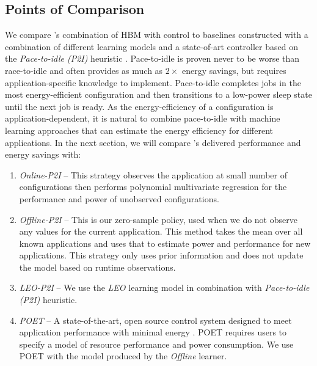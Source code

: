 \subsection{Points of Comparison}
We compare \SYSTEM{}'s combination of HBM with control to baselines
constructed with a combination of different learning models and a
state-of-art controller based on the \emph{Pace-to-idle (P2I)}
heuristic \cite{kim-cpsna}.  Pace-to-idle is proven never to be worse
than race-to-idle and often provides as much as $2\times$ energy
savings, but requires application-specific knowledge to implement.
Pace-to-idle completes jobs in the most energy-efficient configuration
and then transitions to a low-power sleep state until the next job is
ready.  As the energy-efficiency of a configuration is
application-dependent, it is natural to combine pace-to-idle with
machine learning approaches that can estimate the energy efficiency
for different applications.  In the next section, we will compare
\SYSTEM{}'s delivered performance and energy savings with:
\begin{enumerate}
\item \textit{Online-P2I} -- This strategy observes the
  application at small number of configurations then performs
  polynomial multivariate regression for the performance and
  power of unobserved configurations. 
\item \textit{Offline-P2I} -- This is our zero-sample policy, used
  when we do not observe any values for the current application. This
  method takes the mean over all known applications and uses that to
  estimate power and performance for new applications. This strategy
  only uses prior information and does not update the model based on
  runtime observations. 
\item \textit{LEO-P2I} -- We use the \textit{LEO} learning model in
  combination with \emph{Pace-to-idle (P2I)} heuristic.
\item \textit{POET} -- A state-of-the-art, open source control system
  designed to meet application performance with minimal energy
  \cite{POET}.  POET requires users to specify a model of resource
  performance and power consumption.  We use POET with the model
  produced by the \emph{Offline} learner.
\end{enumerate}

